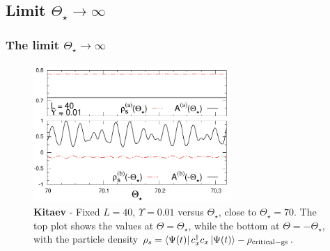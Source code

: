 \subsection{Limit $\Theta_\star \to \infty$}

\begin{frame}	
	\frametitle{The limit $\Theta_\star \to \infty$}

		\begin{figure}
   			\includegraphics[width=7.5cm]{paper/diffThstaru001T70l40.pdf}
  			\caption{ {\bf Kitaev} - Fixed $L = 40$, $\Upsilon = 0.01$ versus
    			$\Theta_\star$, close to $\Theta_\star = 70$.  The top plot shows 
    			the
    			values at $\Theta=\Theta_\star$, while the bottom
    			 at $\Theta=-\Theta_\star$, with the particle density $\rho_s = \bra{\Psi(t)}  c^\dagger_x c_x \ket{\Psi(t)} - \rho_{\rm critical-gs}$. }
			\label{roundtripDiffThetaAR}
		\end{figure}

\end{frame}


